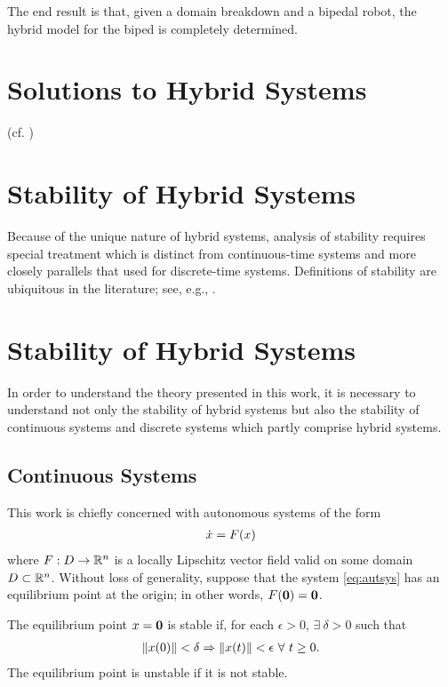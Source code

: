 The end result is that, given a domain breakdown and a bipedal robot, the hybrid model for the biped is completely determined.
%

\section{Solutions to Hybrid Systems} \label{sec:hsys-sol}
(cf. \cite{Ye1998})


\section{Stability of Hybrid Systems}

Because of the unique nature of hybrid systems, analysis of stability requires
special treatment which is distinct from continuous-time systems and more
closely parallels that used for discrete-time systems.
%
Definitions of stability are ubiquitous in the literature; see, e.g.,
\cite{Khalil2002,Teschl2012,Vidyasagar1993}.


\section{Stability of Hybrid Systems}

In order to understand the theory presented in this work, it is necessary to
understand not only the stability of hybrid systems but also the stability of
continuous systems and discrete systems which partly comprise hybrid systems.
%


\subsection{Continuous Systems}
This work is chiefly concerned with autonomous systems of the form
\begin{align}
  \label{eq:autsys}
  {\dot {x}} = F(x)
\end{align}
where $F : D \to \mathbb{R}^{n}$ is a locally Lipschitz vector field valid on some domain
$D \subset \mathbb{R}^{n}$.
%
Without loss of generality, suppose that the system \eqref{eq:autsys} has an equilibrium point at the
origin;
%
in other words, $F({\mathbf 0}) = {\mathbf 0}$.
%
\begin{definition}
  The equilibrium point $x = {\mathbf 0}$ is stable if, for each $\epsilon > 0$,
  $\exists \ \delta > 0$ such that
  \begin{align*}
    \|x(0)\| < \delta \Rightarrow \|x(t)\| < \epsilon \ \forall \ t
    \geq 0.
  \end{align*}
  The equilibrium point is unstable if it is not stable.
\end{definition}

